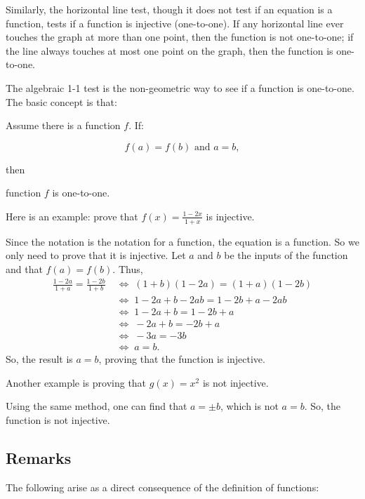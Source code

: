 Similarly, the horizontal line test, though it does not test if an equation is a function,
tests if a function is injective (one-to-one). If any horizontal line ever touches the
graph at more than one point, then the function is not one-to-one; if the line always
touches at most one point on the graph, then the function is one-to-one.

The algebraic 1-1 test is the non-geometric way to see if a function is one-to-one. The
basic concept is that:

Assume there is a function $f$. If:

\[
f(a) = f(b) \text{ and } a = b,
\]

then

function $f$ is one-to-one.

Here is an example: prove that $f(x) = \frac{1 - 2x}{1 + x}$ is injective.

Since the notation is the notation for a function, the equation is a function. So we only need to prove that it is injective. Let $a$ and $b$ be the inputs of the function and that $f(a) = f(b)$. Thus,
\[
\begin{aligned}
\frac{1 - 2a}{1 + a} = \frac{1 - 2b}{1 + b}
&\;\Longleftrightarrow\; (1 + b)(1 - 2a) = (1 + a)(1 - 2b) \\
&\;\Longleftrightarrow\; 1 - 2a + b - 2ab = 1 - 2b + a - 2ab \\
&\;\Longleftrightarrow\; 1 - 2a + b = 1 - 2b + a \\
&\;\Longleftrightarrow\; -2a + b = -2b + a \\
&\;\Longleftrightarrow\; -3a = -3b \\
&\;\Longleftrightarrow\; a = b.
\end{aligned}
\]
So, the result is $a = b$, proving that the function is injective.

Another example is proving that $g(x) = x^2$ is not injective.

Using the same method, one can find that $a = \pm b$, which is not $a = b$. So, the function is not injective.

\subsection{Remarks}
\label{sss:rema-46b8}

The following arise as a direct consequence of the definition of functions:

